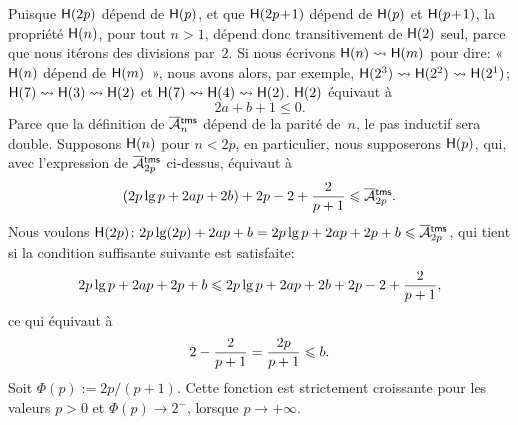 Puisque \(\textsf{H}({2p})\) dépend de \(\textsf{H}({p})\), et que
\(\textsf{H}({2p\!+\!1})\) dépend de \(\textsf{H}({p})\) et
\(\textsf{H}({p\!+\!1})\), la propriété \(\textsf{H}({n})\), pour tout
\(n>1\), dépend donc transitivement de \(\textsf{H}({2})\) seul, parce que
nous itérons des divisions par~\(2\). Si nous écrivons \(\textsf{H}({n})
\leadsto \textsf{H}({m})\) pour dire: «~\(\textsf{H}({n})\) dépend de
\(\textsf{H}({m})\)~», nous avons alors, par exemple, \(\textsf{H}({2^3})
\leadsto \textsf{H}({2^2}) \leadsto \textsf{H}({2^1})\); \(\textsf{H}({7})
\leadsto \textsf{H}({3}) \leadsto \textsf{H}({2})\) et \(\textsf{H}({7}) \leadsto
\textsf{H}({4}) \leadsto \textsf{H}({2})\). \(\textsf{H}({2})\) équivaut à
\begin{equation}
2a + b + 1 \leqslant 0.
\label{ineq:base_lower_Atms}
\end{equation}
Parce que la définition de \(\OM{\fun{tms}}{n}\) dépend de la parité
de~\(n\), le pas inductif sera double. Supposons
\(\textsf{H}({n})\) pour \(n < 2p\), en particulier, nous supposerons
\(\textsf{H}({p})\), qui, avec l'expression de \(\OM{\fun{tms}}{2p}\)
ci-dessus, équivaut à
\begin{equation*}
\abovedisplayskip=2pt
\belowdisplayskip=2pt
 (2p\lg p + 2ap + 2b) + 2p - 2 + \frac{2}{p+1} \leqslant \OM{\fun{tms}}{2p}.
\end{equation*}
Nous voulons \(\pred{H}{2p} \colon 2p\lg(2p) + 2ap + b
= 2p\lg p + 2ap + 2p + b \leqslant \OM{\fun{tms}}{2p}\), qui tient si
la condition suffisante suivante est satisfaite:
\begin{equation*}
\abovedisplayskip=0pt
\belowdisplayskip=2pt
2p\lg p + 2ap + 2p + b \leqslant 2p\lg p + 2ap + 2b + 2p - 2 + \frac{2}{p+1},
\end{equation*}
ce qui équivaut à
\begin{equation*}
\abovedisplayskip=0pt
\belowdisplayskip=2pt
2 - \frac{2}{p+1} = \frac{2p}{p+1} \leqslant b.
\end{equation*}
Soit \(\Phi(p) := 2p/(p+1)\). Cette fonction est strictement
croissante pour les valeurs \(p > 0\) et \(\Phi(p) \rightarrow
2^{-}\), lorsque \(p \rightarrow +\infty\).


